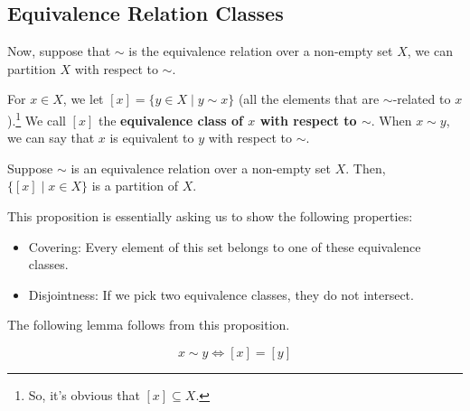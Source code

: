 \documentclass[letterpaper]{article}
\begin{document}
\subsection{Equivalence Relation Classes}
Now, suppose that $\sim$ is the equivalence relation over a non-empty set $X$, we can partition $X$ with respect to $\sim$. 

\bigskip 

For $x \in X$, we let $[x] = \{y \in X \mid y \sim x\}$ (all the elements that are $\sim$-related to $x$).\footnote{So, it's obvious that $[x] \subseteq X$.} We call $[x]$ the \textbf{equivalence class of $x$ with respect to $\sim$}. When $x \sim y$, we can say that $x$ is equivalent to $y$ with respect to $\sim$. 

\begin{mdframed}
    \begin{proposition}
        Suppose $\sim$ is an equivalence relation over a non-empty set $X$. Then, $\{[x] \mid x \in X\}$ is a partition of $X$. 
    \end{proposition}
\end{mdframed}
This proposition is essentially asking us to show the following properties: 
\begin{itemize}
    \item Covering: Every element of this set belongs to one of these equivalence classes. 
    \item Disjointness: If we pick two equivalence classes, they do not intersect.
\end{itemize}
The following lemma follows from this proposition.
\begin{lemma}{}{}
    \[x \sim y \iff [x] = [y]\]
\end{lemma}
\end{document}
